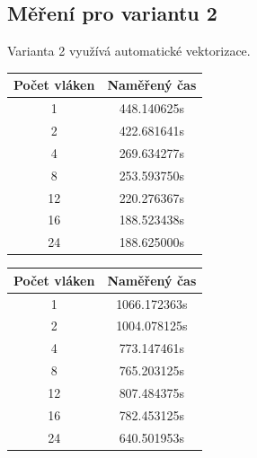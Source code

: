 \documentclass[12pt]{article}
\begin{document}
\subsection{Měření pro variantu 2}
Varianta 2 využívá automatické vektorizace. %
\begin{table}[H]
\parbox{.45\linewidth}{
%
%
\begin{center}
\begin{tabular}{ c | c }
\textbf{Počet vláken} & \textbf{Naměřený čas} \\ \hline \hline 
1 & 448.140625s \\ \hline
2 & 422.681641s \\ \hline
4 & 269.634277s \\ \hline
8 & 253.593750s \\ \hline
12 & 220.276367s \\ \hline
16 & 188.523438s \\ \hline
24 & 188.625000s \\ \hline
\end{tabular}
\end{center}
}
\hfill
\parbox{.45\linewidth}{
%
%
\begin{center}
\begin{tabular}{ c | c }
\textbf{Počet vláken} & \textbf{Naměřený čas} \\ \hline \hline 
1 & 1066.172363s \\ \hline
2 & 1004.078125s \\ \hline
4 & 773.147461s \\ \hline
8 & 765.203125s \\ \hline
12 & 807.484375s \\ \hline
16 & 782.453125s \\ \hline
24 & 640.501953s \\ \hline
\end{tabular}
\end{center}
}
\end{table}
\end{document}
